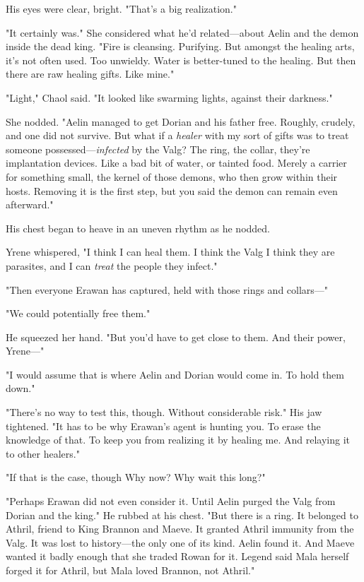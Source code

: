His eyes were clear, bright. "That's a big realization."

"It certainly was." She considered what he'd related---about Aelin and the demon inside the dead king. "Fire is cleansing. Purifying. But amongst the healing arts, it's not often used. Too unwieldy. Water is better-tuned to the healing. But then there are raw healing gifts. Like mine."

"Light," Chaol said. "It looked like swarming lights, against their darkness."

She nodded. "Aelin managed to get Dorian and his father free. Roughly, crudely, and one did not survive. But what if a \emph{healer} with my sort of gifts was to treat someone possessed---\emph{infected} by the Valg? The ring, the collar, they're implantation devices. Like a bad bit of water, or tainted food. Merely a carrier for something small, the kernel of those demons, who then grow within their hosts. Removing it is the first step, but you said the demon can remain even afterward."

His chest began to heave in an uneven rhythm as he nodded.

Yrene whispered, "I think I can heal them. I think the Valg  I think they are parasites, and I can \emph{treat} the people they infect."

"Then everyone Erawan has captured, held with those rings and collars---"

"We could potentially free them."

He squeezed her hand. "But you'd have to get close to them. And their power, Yrene---"

"I would assume that is where Aelin and Dorian would come in. To hold them down."

"There's no way to test this, though. Without considerable risk." His jaw tightened. "It has to be why Erawan's agent is hunting you. To erase the knowledge of that. To keep you from realizing it by healing me. And relaying it to other healers."

"If that is the case, though  Why now? Why wait this long?"

"Perhaps Erawan did not even consider it. Until Aelin purged the Valg from Dorian and the king." He rubbed at his chest. "But there is a ring. It belonged to Athril, friend to King Brannon and Maeve. It granted Athril immunity from the Valg. It was lost to history---the only one of its kind. Aelin found it. And Maeve wanted it badly enough that she traded Rowan for it. Legend said Mala herself forged it for Athril, but  Mala loved Brannon, not Athril."

